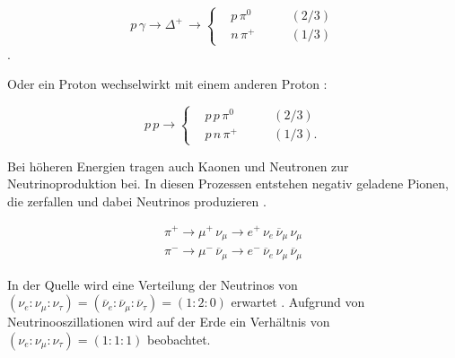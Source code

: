 \begin{equation*}
p\, \gamma \rightarrow \Delta^+ \, \rightarrow	
\left\{
\begin{aligned}
& p \, \pi^0 & \qquad (2/3) \\
& n \, \pi^+ & \qquad (1/3)
\end{aligned}
\right.
\end{equation*}.

Oder ein Proton wechselwirkt mit einem anderen Proton \cite{DissBecker}:

\begin{equation*}
p \, p \rightarrow
\left\{
\begin{aligned}
& p \, p \, \pi^0 & \qquad (2/3) \\
& p \, n \, \pi^+ & \qquad (1/3).
\end{aligned}
\right.
\end{equation*}

Bei höheren Energien tragen auch Kaonen und Neutronen zur Neutrinoproduktion bei.
In diesen Prozessen entstehen negativ geladene Pionen, die zerfallen und dabei Neutrinos produzieren \cite{NeutrinoOszillation}.

\begin{equation*}
 \begin{aligned}
 \pi^+ \rightarrow \mu^+ \, \nu_{\mu} \rightarrow e^+ \, \nu_e \, \overline{\nu}_{\mu} \, \nu_{\mu} \\ 
 \pi^- \rightarrow \mu^- \, \overline{\nu}_{\mu} \rightarrow e^- \, \overline{\nu}_e \, \nu_{\mu} \, \overline{\nu}_{\mu}
 \end{aligned}
\end{equation*}


In der Quelle wird eine Verteilung der Neutrinos von $(\nu_e:\nu_{\mu}:\nu_{\tau})=(\overline{\nu}_e:\overline{\nu}_{\mu}:\overline{\nu}_{\tau})=(1:2:0)$ erwartet \cite{NeutrinoOszillation}.
Aufgrund von Neutrinooszillationen wird auf der Erde ein Verhältnis von $(\nu_e:\nu_{\mu}:\nu_{\tau})=(1:1:1)$ \cite{NeutrinoOszillation} beobachtet.



